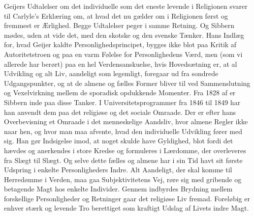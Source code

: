 \documentclass[12pt,a4paper,openany]{book}
\begin{document}
Geijers Udtalelser om det individuelle som det eneste levende i
Religionen svarer til Carlyle’s Erklæring om, at hvad det nu gælder
om i Religionen først og fremmest er Ærlighed. Begge Udtalelser peger
i samme Retning. Og Sibbern mødes, uden at vide det, med den
skotske og den svenske Tænker. Hans Indlæg for, hvad Geijer kaldte
Personlighedsprincipet, bygges ikke blot paa Kritik af Autoritetstroen
og paa en varm Følelse for Personlighedens Værd, men (som
vi allerede har berørt) paa en hel Verdensanskuelse, hvis Hovedsætning
er, at al Udvikling og alt Liv, aandeligt som legemligt, foregaar
ud fra sondrede Udgangspunkter, og at de almene og fælles Former
bliver til ved Sammenslutning og Vexelvirkning mellem de sporadisk
opdukkende Momenter. Fra 1828 af er Sibbern inde paa disse Tanker.
I Universitetsprogrammer fra 1846 til 1849 har han anvendt
dem paa det religiøse og det sociale Omraade. Der er efter hans
Overbevisning et Omraade i det menneskelige Aandsliv, hvor almene
Regler ikke naar hen, og hvor man maa afvente, hvad den individuelle
Udvikling fører med sig. Han gør Indsigelse imod, at noget
skulde have Gyldighed, blot fordi det hævdes og anerkendes i store
Kredse og formuleres i Lærdomme, der overleveres fra Slægt til
Slægt. Og selve dette fælles og almene har i sin Tid havt sit første
Udspring i enkelte Personligheders Indre. Alt Aandeligt, der skal
komme til Herredømme i Verden, maa gaa Subjektivitetens Vej, røre
sig med gribende og betagende Magt hos enkelte Individer. Gennem
indbyrdes Brydning mellem forskellige Personligheder og Retninger
gaar det religiøse Liv fremad. Foreløbig er enhver stærk og levende
Tro berettiget som kraftigt Udslag af Livets indre Magt.
\end{document}
